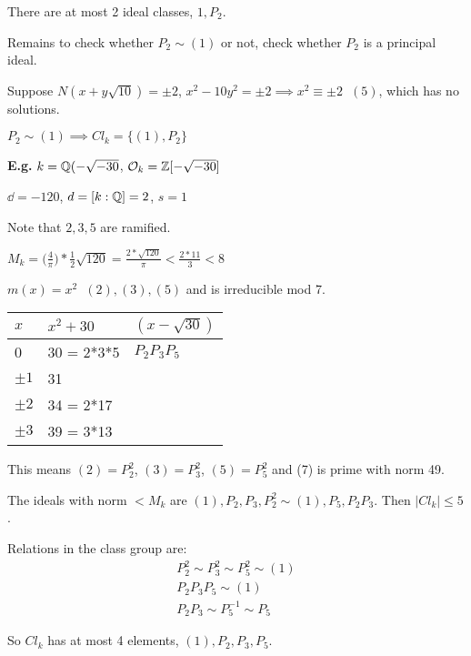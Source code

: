 \documentclass[11pt]{article}
\begin{document}
There are at most 2 ideal classes, $1, P_2$.

Remains to check whether $P_2 \sim (1)$ or not, check whether $P_2$ is a principal ideal.
\spa

Suppose $N(x+y\sqrt{10}) = \pm 2$, \hspace{5pt} $x^2-10y^2 = \pm 2 \implies x^2 \equiv \pm 2 \hspace{7pt} (5) $, which has no solutions. \lightning
\spa

$P_2 \sim(1) \implies Cl_k = \{(1), P_2\}$

\spa
\textbf{E.g.} $ k = \mathbb{Q}(-\sqrt{-30} $,\hspace{7pt} $\mathcal{O}_k = \mathbb{Z}[-\sqrt{-30}]$


$ \dd = -120$,  \hspace{7pt} $d = [k:\mathbb{Q}] = 2$, \hspace{7pt} $s = 1$

Note that $2,3,5$ are ramified.
\spa

$M_k= \big( \frac4\pi \big)* \frac12 \sqrt{120} = \frac{2*\sqrt{120}}{\pi} < \frac{2*11}{3} < 8$
\spa

$m(x) = x^2 \hspace{7pt} (2),(3),(5) $ and is irreducible mod 7.
\spac

\begin{tabular}{|l|l|l|}
	$x$     & $x^2+30$   & $(x-\sqrt{30})$ \\ \hline
	0       & 30 = 2*3*5 & $P_2P_3P_5$     \\
	$\pm 1$ & 31         &                 \\
	$\pm 2$ & 34 = 2*17  &                 \\
	$\pm 3$ & 39 = 3*13  &                
\end{tabular}
\spac

This means $(2) = P_2^2$,\hspace{7pt}  $(3) = P_3^2 $, \hspace{7pt} $(5) = P_5^2$ and (7) is prime with norm 49.
\spa

The ideals with norm $< M_k$ are $(1), P_2, P_3, P_2^2 \sim (1) , P_5, P_2P_3$. Then $|Cl_k | \leq 5$.
\spa

Relations in the class group are:
\begin{align*}
	P_2^2 \sim P_3^2 \sim P_5^2 \sim (1)\\
	P_2P_3P_5\sim(1)\\
	P_2P_3 \sim P_5^{-1} \sim P_5
\end{align*}

So $Cl_k$ has at most 4 elements, $(1), P_2, P_3, P_5$.
\spa
\end{document}
